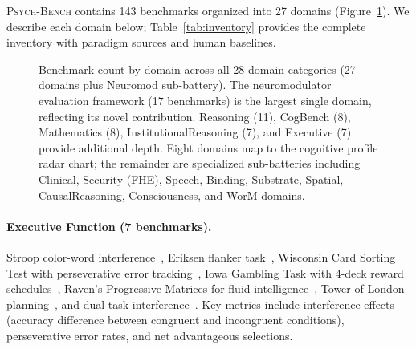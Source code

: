 \documentclass[11pt,letterpaper]{article}
\newcommand{\psychbench}{\textsc{Psych-Bench}}
\begin{document}
\psychbench{} contains 143 benchmarks organized into 27 domains (Figure~\ref{fig:domain_matrix}). We describe each domain below; Table~\ref{tab:inventory} provides the complete inventory with paradigm sources and human baselines.

\begin{figure}[t]
\centering
{}
\caption{Benchmark count by domain across all 28 domain categories (27 domains plus Neuromod sub-battery). The neuromodulator evaluation framework (17 benchmarks) is the largest single domain, reflecting its novel contribution. Reasoning (11), CogBench (8), Mathematics (8), InstitutionalReasoning (7), and Executive (7) provide additional depth. Eight domains map to the cognitive profile radar chart; the remainder are specialized sub-batteries including Clinical, Security (FHE), Speech, Binding, Substrate, Spatial, CausalReasoning, Consciousness, and WorM domains.}
\label{fig:domain_matrix}
\end{figure}

\paragraph{Executive Function (7 benchmarks).} Stroop color-word interference~\citep{stroop1935interference,macleod1991half}, Eriksen flanker task~\citep{eriksen1974effects}, Wisconsin Card Sorting Test with perseverative error tracking~\citep{berg1948simple}, Iowa Gambling Task with 4-deck reward schedules~\citep{bechara1994insensitivity}, Raven's Progressive Matrices for fluid intelligence~\citep{raven1938progressive}, Tower of London planning~\citep{shallice1982specific}, and dual-task interference~\citep{pashler1994dual}. Key metrics include interference effects (accuracy difference between congruent and incongruent conditions), perseverative error rates, and net advantageous selections.
\end{document}
